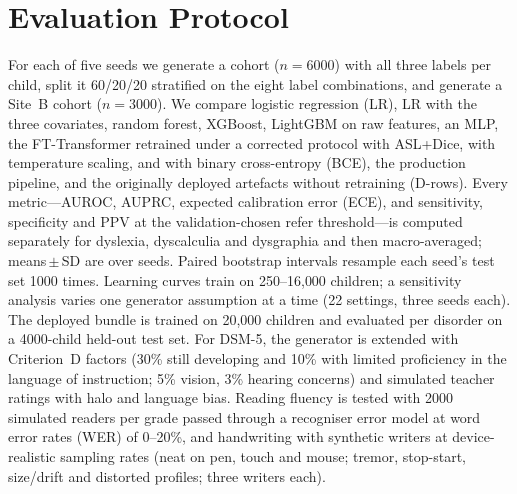 \documentclass[conference]{IEEEtran}
\begin{document}
\section{Evaluation Protocol}\label{sec:protocol}
For each of five seeds we generate a cohort ($n{=}6000$) with all three labels per child, split it 60/20/20 stratified on the eight label combinations, and generate a Site~B cohort ($n{=}3000$). We compare logistic regression (LR), LR with the three covariates, random forest, XGBoost, LightGBM on raw features, an MLP, the FT-Transformer retrained under a corrected protocol with ASL+Dice, with temperature scaling, and with binary cross-entropy (BCE), the production pipeline, and the originally deployed artefacts without retraining (D-rows). Every metric---AUROC, AUPRC, expected calibration error (ECE), and sensitivity, specificity and PPV at the validation-chosen refer threshold---is computed separately for dyslexia, dyscalculia and dysgraphia and then macro-averaged; means\,$\pm$\,SD are over seeds. Paired bootstrap intervals resample each seed's test set 1000 times. Learning curves train on 250--16{,}000 children; a sensitivity analysis varies one generator assumption at a time (22 settings, three seeds each). The deployed bundle is trained on 20{,}000 children and evaluated per disorder on a 4000-child held-out test set. For DSM-5, the generator is extended with Criterion~D factors (30\% still developing and 10\% with limited proficiency in the language of instruction; 5\% vision, 3\% hearing concerns) and simulated teacher ratings with halo and language bias. Reading fluency is tested with 2000 simulated readers per grade passed through a recogniser error model at word error rates (WER) of 0--20\%, and handwriting with synthetic writers at device-realistic sampling rates (neat on pen, touch and mouse; tremor, stop-start, size/drift and distorted profiles; three writers each).

\end{document}
